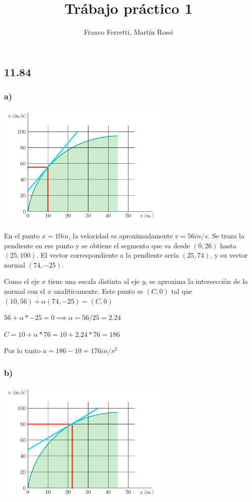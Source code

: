 \documentclass[12pt]{article}
\title{\LARGE \textbf{Trábajo práctico 1}}
\author{Franco Ferretti, Martín Rossi}
\date{}
\begin{document}
\maketitle
\subsection*{11.84}
\subsubsection*{a)}
\includegraphics[width=320px]{1184a}

En el punto $x=10in$, la velocidad es aproximadamente $v=56in/s$. Se traza la pendiente en ese punto y se obtiene el segmento que va desde $(0,26)$ hasta $(25,100)$. El vector correspondiente a la pendiente sería $(25,74)$, y su vector normal $(74,-25)$.

Como el eje $x$ tiene una escala distinta al eje $y$, se aproxima la intersección de la normal con el $x$ analíticamente. Este punto es $(C,0)$ tal que $(10,56)+\alpha(74,-25)=(C,0)$

$56+\alpha*-25=0 \implies \alpha=56/25=2.24$

$C=10+\alpha*76=10+2.24*76=186$

Por lo tanto $a=186-10=176in/s^2$
\subsubsection*{b)}
\includegraphics[width=320px]{1184b}
\end{document}
